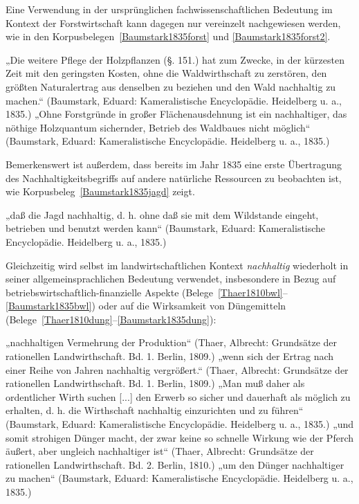 \documentclass[
    german,
    a4paper,%
    12pt,%
    oneside,%
    toc=bibliography,
    final,
]{scrartcl}
\begin{document}
Eine Verwendung in der ursprünglichen fachwissenschaftlichen Bedeutung im Kontext der Forstwirtschaft kann dagegen nur vereinzelt nachgewiesen werden, wie in den Korpusbelegen~\ref{Baumstark1835forst} und \ref{Baumstark1835forst2}.

\begin{exe}
\ex „Die weitere Pflege der Holzpflanzen (§. 151.) hat zum Zwecke, in der kürzesten Zeit mit den geringsten Kosten, ohne die Waldwirthschaft zu zerstören, den größten Naturalertrag aus denselben zu beziehen und den Wald nachhaltig zu machen.“ (Baumstark, Eduard: Kameralistische Encyclopädie. Heidelberg u. a., 1835.)
\label{Baumstark1835forst}
\ex „Ohne Forstgründe in großer Flächenausdehnung ist ein nachhaltiger, das nöthige Holzquantum sichernder, Betrieb des Waldbaues nicht möglich“ (Baumstark, Eduard: Kameralistische Encyclopädie. Heidelberg u. a., 1835.)
\label{Baumstark1835forst2}
\end{exe}

Bemerkenswert ist außerdem, dass bereits im Jahr 1835 eine erste Übertragung des Nachhaltigkeitsbegriffs auf andere natürliche Ressourcen zu beobachten ist, wie Korpusbeleg~\ref{Baumstark1835jagd} zeigt.

\begin{exe}
\ex „daß die Jagd nachhaltig, d. h. ohne daß sie mit dem Wildstande eingeht, betrieben und benutzt werden kann“ (Baumstark, Eduard: Kameralistische Encyclopädie. Heidelberg u. a., 1835.)
\label{Baumstark1835jagd}
\end{exe}

Gleichzeitig wird selbst im landwirtschaftlichen Kontext \textit{nachhaltig} wiederholt in seiner allgemeinsprachlichen Bedeutung verwendet, insbesondere in Bezug auf betriebswirtschaftlich-finanzielle Aspekte (Belege~\ref{Thaer1810bwl}–\ref{Baumstark1835bwl}) oder auf die Wirksamkeit von Düngemitteln (Belege~\ref{Thaer1810dung}–\ref{Baumstark1835dung}):

\begin{exe}
\ex „nachhaltigen Vermehrung der Produktion“ (Thaer, Albrecht: Grundsätze der rationellen Landwirthschaft. Bd. 1. Berlin, 1809.)
\label{Thaer1810bwl}
\ex „wenn sich der Ertrag nach einer Reihe von Jahren nachhaltig vergrößert.“ (Thaer, Albrecht: Grundsätze der rationellen Landwirthschaft. Bd. 1. Berlin, 1809.)
\ex „Man muß daher als ordentlicher Wirth suchen [...] den Erwerb so sicher und dauerhaft als möglich zu erhalten, d. h. die Wirthschaft nachhaltig einzurichten und zu führen“ (Baumstark, Eduard: Kameralistische Encyclopädie. Heidelberg u. a., 1835.)
\label{Baumstark1835bwl}
\ex „und somit strohigen Dünger macht, der zwar keine so schnelle Wirkung wie der Pferch äußert, aber ungleich nachhaltiger ist“ (Thaer, Albrecht: Grundsätze der rationellen Landwirthschaft. Bd. 2. Berlin, 1810.)
\label{Thaer1810dung}
\ex „um den Dünger nachhaltiger zu machen“ (Baumstark, Eduard: Kameralistische Encyclopädie. Heidelberg u. a., 1835.)
\label{Baumstark1835dung}
\end{exe}
\end{document}
